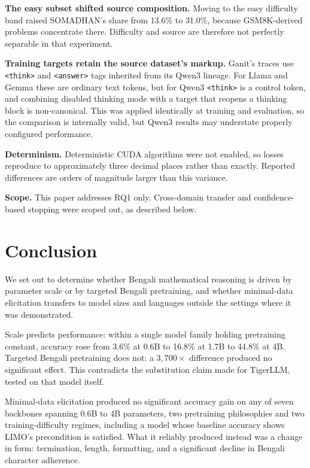 \documentclass[10pt,twocolumn,letterpaper]{article}
\begin{document}
\textbf{The easy subset shifted source composition.} Moving to the easy
difficulty band raised SOMADHAN's share from 13.6\% to 31.0\%, because
GSM8K-derived problems concentrate there. Difficulty and source are therefore
not perfectly separable in that experiment.

\textbf{Training targets retain the source dataset's markup.} Ganit's traces use
\texttt{<think>} and \texttt{<answer>} tags inherited from its Qwen3 lineage. For
Llama and Gemma these are ordinary text tokens, but for Qwen3 \texttt{<think>}
is a control token, and combining disabled thinking mode with a target that
reopens a thinking block is non-canonical. This was applied identically at
training and evaluation, so the comparison is internally valid, but Qwen3 results
may understate properly configured performance.

\textbf{Determinism.} Deterministic CUDA algorithms were not enabled, so losses
reproduce to approximately three decimal places rather than exactly. Reported
differences are orders of magnitude larger than this variance.

\textbf{Scope.} This paper addresses RQ1 only. Cross-domain transfer and
confidence-based stopping were scoped out, as described below.


\section{Conclusion}

We set out to determine whether Bengali mathematical reasoning is driven by
parameter scale or by targeted Bengali pretraining, and whether minimal-data
elicitation transfers to model sizes and languages outside the settings where it
was demonstrated.

Scale predicts performance: within a single model family holding
pretraining constant, accuracy rose from 3.6\% at 0.6B to 16.8\% at 1.7B to
44.8\% at 4B. Targeted Bengali pretraining does not: a
$3{,}700\times$ difference produced no significant effect. This contradicts the
substitution claim made for TigerLLM, tested on that model itself.

Minimal-data elicitation produced no significant accuracy gain on any of seven
backbones spanning 0.6B to 4B parameters, two pretraining philosophies and two
training-difficulty regimes, including a model whose baseline accuracy shows
LIMO's precondition is satisfied. What it reliably produced instead was a change
in form: termination, length, formatting, and a significant decline in Bengali
character adherence.
\end{document}
